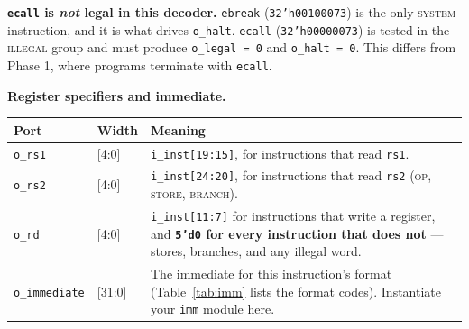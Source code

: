 \documentclass[11pt]{article}
\begin{document}
\begin{important}
\textbf{\texttt{ecall} is \emph{not} legal in this decoder.} \texttt{ebreak}
(\texttt{32'h00100073}) is the only \textsc{system} instruction, and it is what
drives \texttt{o\_halt}. \texttt{ecall} (\texttt{32'h00000073}) is tested in the
\textsc{illegal} group and must produce \texttt{o\_legal = 0} and
\texttt{o\_halt = 0}. This differs from Phase 1, where programs terminate with
\texttt{ecall}.
\end{important}

\noindent\begin{minipage}{\linewidth}
\textbf{Register specifiers and immediate.}

\smallskip

\begin{center}
\begin{tabular}{@{}llp{12.0cm}@{}}
\toprule
\textbf{Port} & \textbf{Width} & \textbf{Meaning} \\
\midrule
\texttt{o\_rs1}       & [4:0]  & \texttt{i\_inst[19:15]}, for instructions that read \texttt{rs1}. \\
\texttt{o\_rs2}       & [4:0]  & \texttt{i\_inst[24:20]}, for instructions that read \texttt{rs2} (\textsc{op}, \textsc{store}, \textsc{branch}). \\
\texttt{o\_rd}        & [4:0]  & \texttt{i\_inst[11:7]} for instructions that write a register, and \textbf{\texttt{5'd0} for every instruction that does not} --- stores, branches, and any illegal word. \\
\texttt{o\_immediate} & [31:0] & The immediate for this instruction's format (Table~\ref{tab:imm} lists the format codes). Instantiate your \texttt{imm} module here. \\
\bottomrule
\end{tabular}
\end{center}
\end{minipage}
\par\medskip
\end{document}
